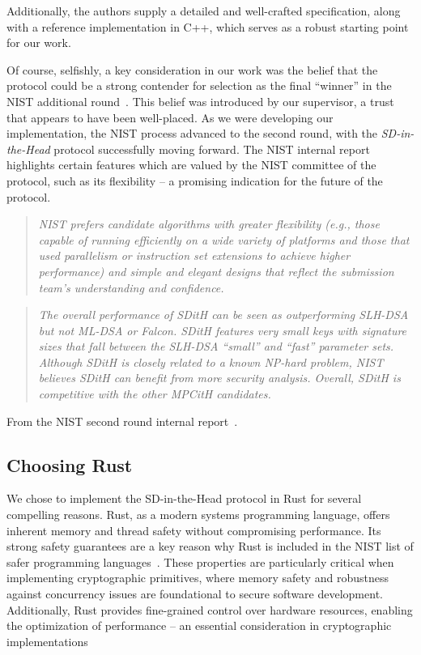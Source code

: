 \documentclass[11pt]{report}
\theoremstyle{definition}
\theoremstyle{plain}
\begin{document}
Additionally, the authors supply a detailed and well-crafted specification, along with a reference implementation in C++, which serves as a robust starting point for our work.

Of course, selfishly, a key consideration in our work was the belief that the protocol could be a strong contender for selection as the final ``winner'' in the NIST additional round~\cite{nistcall}. This belief was introduced by our supervisor, a trust that appears to have been well-placed. As we were developing our implementation, the NIST process advanced to the second round, with the \emph{SD-in-the-Head} protocol successfully moving forward. The NIST internal report highlights certain features which are valued by the NIST committee of the protocol, such as its flexibility  -- a promising indication for the future of the protocol.

\begin{quote}
  \textit{NIST prefers candidate algorithms with greater flexibility (e.g., those capable of running efficiently on a wide variety of platforms and those that used parallelism or instruction set extensions to achieve higher performance) and simple and elegant designs that reflect the submission team's understanding and confidence.}
\end{quote}

\begin{quote}
  \textit{The overall performance of SDitH can be seen as outperforming SLH-DSA but not ML-DSA or Falcon. SDitH features very small keys with signature sizes that fall between the SLH-DSA ``small'' and ``fast'' parameter sets. Although SDitH is closely related to a known NP-hard problem, NIST believes SDitH can benefit from more security analysis. Overall, SDitH is competitive with the other MPCitH candidates.}
\end{quote}

From the NIST second round internal report~\cite{alagic2024status}.

\subsection{Choosing Rust}
We chose to implement the SD-in-the-Head protocol in Rust for several compelling reasons. Rust, as a modern systems programming language, offers inherent memory and thread safety without compromising performance. Its strong safety guarantees\cite{jung2017rustbelt} are a key reason why Rust is included in the NIST list of safer programming languages~\cite{nistsaferlanguages}. These properties are particularly critical when implementing cryptographic primitives, where memory safety and robustness against concurrency issues are foundational to secure software development. Additionally, Rust provides fine-grained control over hardware resources, enabling the optimization of performance -- an essential consideration in cryptographic implementations
\end{document}
